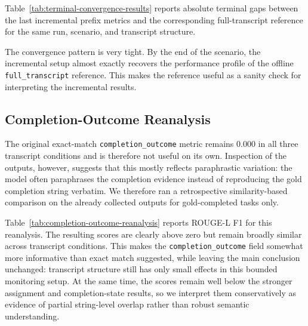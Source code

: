 Table~\ref{tab:terminal-convergence-results} reports absolute terminal gaps between the last incremental prefix metrics and the corresponding full-transcript reference for the same run, scenario, and transcript structure.

The convergence pattern is very tight. By the end of the scenario, the incremental setup almost exactly recovers the performance profile of the offline \texttt{full\_transcript} reference. This makes the reference useful as a sanity check for interpreting the incremental results.

\begin{table}[t]
\centering
\small
{}
\caption{Terminal convergence of the last incremental prefix to the offline full-transcript reference.}
\label{tab:terminal-convergence-results}
\end{table}

\subsection{Completion-Outcome Reanalysis}

The original exact-match \texttt{completion\_outcome} metric remains 0.000 in all three transcript conditions and is therefore not useful on its own. Inspection of the outputs, however, suggests that this mostly reflects paraphrastic variation: the model often paraphrases the completion evidence instead of reproducing the gold completion string verbatim. We therefore ran a retrospective similarity-based comparison on the already collected outputs for gold-completed tasks only.

Table~\ref{tab:completion-outcome-reanalysis} reports ROUGE-L F1 for this reanalysis. The resulting scores are clearly above zero but remain broadly similar across transcript conditions. This makes the \texttt{completion\_outcome} field somewhat more informative than exact match suggested, while leaving the main conclusion unchanged: transcript structure still has only small effects in this bounded monitoring setup. At the same time, the scores remain well below the stronger assignment and completion-state results, so we interpret them conservatively as evidence of partial string-level overlap rather than robust semantic understanding.

